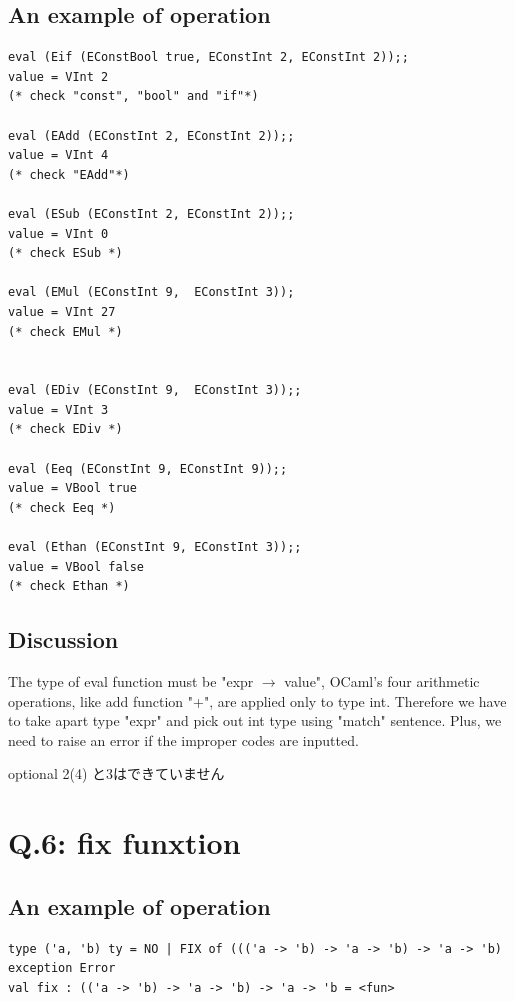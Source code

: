 \documentclass[uplatex,12pt]{jsarticle}
\begin{document}
\subsection{An example of operation}

\begin{lstlisting}[caption=test code]
eval (Eif (EConstBool true, EConstInt 2, EConstInt 2));;
value = VInt 2
(* check "const", "bool" and "if"*)

eval (EAdd (EConstInt 2, EConstInt 2));;
value = VInt 4
(* check "EAdd"*)

eval (ESub (EConstInt 2, EConstInt 2));;
value = VInt 0
(* check ESub *)

eval (EMul (EConstInt 9,  EConstInt 3));
value = VInt 27
(* check EMul *)


eval (EDiv (EConstInt 9,  EConstInt 3));;
value = VInt 3
(* check EDiv *)

eval (Eeq (EConstInt 9, EConstInt 9));;
value = VBool true
(* check Eeq *)

eval (Ethan (EConstInt 9, EConstInt 3));;
value = VBool false
(* check Ethan *)

\end{lstlisting}


\vspace{12pt}
\subsection{Discussion}
The type of eval function must be "expr $\rightarrow$ value", OCaml's four arithmetic operations, like add function "+", are applied only to type int. Therefore we have to take apart type "expr" and pick out int type using "match" sentence. Plus, we need to raise an error if the improper codes are inputted.

\vspace{12pt}
optional 2(4) と3はできていません

\section{Q.6: fix funxtion}
\subsection{An example of operation}

\begin{lstlisting}[caption=test code]
type ('a, 'b) ty = NO | FIX of ((('a -> 'b) -> 'a -> 'b) -> 'a -> 'b)
exception Error
val fix : (('a -> 'b) -> 'a -> 'b) -> 'a -> 'b = <fun>
\end{lstlisting}
\end{document}
